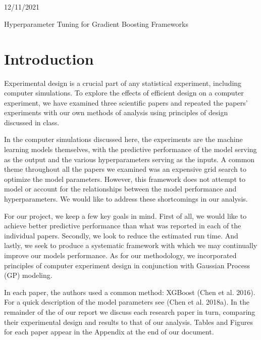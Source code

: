 \documentclass[12pt]{article}
\begin{document}
 \\
 \\
12/11/2021 \\
\begin{center}
{\huge Hyperparameter Tuning for Gradient Boosting Frameworks } 
\end{center}

\section{Introduction}
Experimental design is a crucial part of any statistical experiment, including computer simulations. To explore the effects of efficient design on a computer experiment, we have examined three scientific papers and repeated the papers’ experiments with our own methods of analysis using principles of design discussed in class. 

In the computer simulations discussed here, the experiments are the machine learning models themselves, with the predictive performance of the model serving as the output and the various hyperparameters serving as the inputs. A common theme throughout all the papers we examined was an expensive grid search to optimize the model parameters. However, this framework does not attempt to model or account for the relationships between the model performance and hyperparameters. We would like to address these shortcomings in our analysis. 

 For our project, we keep a few key goals in mind. First of all, we would like to achieve better predictive performance than what was reported in each of the individual papers. Secondly, we look to reduce the estimated run time. And lastly, we seek to produce a systematic framework with which we may continually improve our models performance. As for our methodology, we incorporated principles of computer experiment design in conjunction with Gaussian Process (GP) modeling.
 
In each paper, the authors used a common method: XGBoost (Chen et al. 2016). For a quick description of the model parameters see (Chen et al. 2018a). In the remainder of the of our report we discuss each research paper in turn, comparing their experimental design and results to that of our analysis. Tables and Figures for each paper appear in the Appendix at the end of our document.
\end{document}
